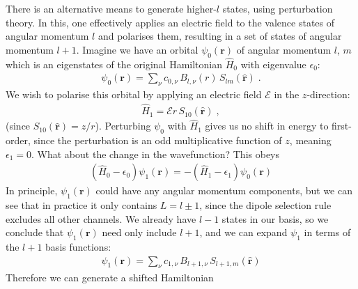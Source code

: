 \documentclass[letterpaper,10pt,english]{sphinxmanual}
\begin{document}
There is an alternative means to generate higher-\(l\) states,
using perturbation theory. In this, one effectively applies an electric
field to the valence states of angular momentum \(l\) and polarises
them, resulting in a set of states of angular momentum \(l+1\).
Imagine we have an orbital \(\psi_{0}(\mathbf{r})\) of angular
momentum \(l\), \(m\) which is an eigenstates of the original
Hamiltonian \(\hat{H}_{0}\) with eigenvalue \(\epsilon_{0}\):
\begin{equation*}
\begin{split}\psi_{0}(\mathbf{r})=\sum_{\nu}c_{0,\nu}\, B_{l,\nu}(r)\, S_{lm}(\hat{\mathbf{r}})\;.\end{split}
\end{equation*}
We wish to polarise this orbital by applying an electric field
\(\mathcal{E}\) in the \(z\)-direction:
\begin{equation*}
\begin{split}\hat{H}_{1}=\mathcal{E}r\, S_{10}(\hat{\mathbf{r}})\;,\end{split}
\end{equation*}
(since \(S_{10}(\hat{\mathbf{r}})=z/r\)). Perturbing
\(\psi_{0}\) with \(\hat{H}_{1}\) gives us no shift in energy to
first-order, since the perturbation is an odd multiplicative function of
\(z\), meaning \(\epsilon_{1}=0\). What about the change in the
wavefunction? This obeys
\begin{equation*}
\begin{split}(\hat{H}_{0}-\epsilon_{0})\psi_{1}(\mathbf{r})=-(\hat{H}_{1}-\epsilon_{1})\psi_{0}(\mathbf{r})\label{eq:pert}\end{split}
\end{equation*}
In principle, \(\psi_{1}(\mathbf{r})\) could have any angular
momentum components, but we can see that in practice it only contains
\(L=l\pm1\), since the dipole selection rule excludes all other
channels. We already have \(l-1\) states in our basis, so we
conclude that \(\psi_{1}(\mathbf{r})\) need only include
\(l+1\), and we can expand \(\psi_{1}\) in terms of the
\(l+1\) basis functions:
\begin{equation*}
\begin{split}\psi_{1}(\mathbf{r})=\sum_{\nu}c_{1,\nu}\, B_{l+1,\nu}\, S_{l+1,m}(\hat{\mathbf{r}})\end{split}
\end{equation*}
Therefore we can generate a shifted Hamiltonian
\end{document}
